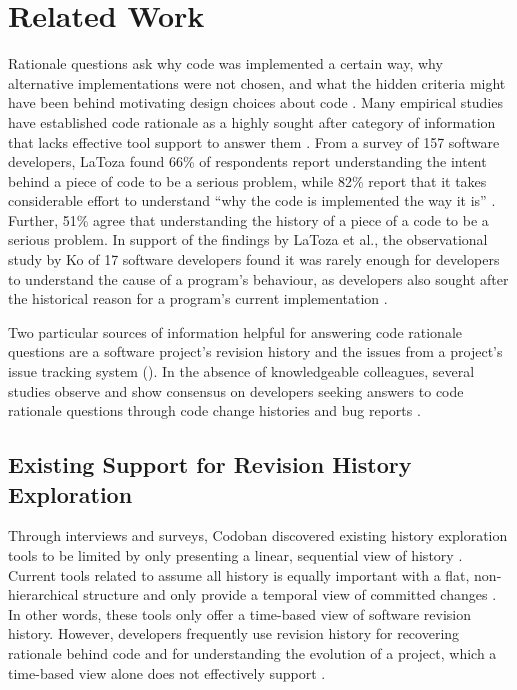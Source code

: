 \chapter{Related Work}
\label{ch:Related-Work}

Rationale questions ask why code was implemented a certain way, 
why alternative implementations were not chosen, and what the hidden criteria might have been behind motivating design choices about code \cite{latoza_hard-answer_2010}.
Many empirical studies have established code rationale as a highly sought after category of information that lacks effective tool support to answer them \cite{latoza_maintaining_2006, latoza_hard-answer_2010, ko_information_2007}. 
From a survey of 157 software developers, LaToza \etal found 66\% of respondents report understanding the intent behind a piece of code to be a serious problem, 
while 82\% report that it takes considerable effort to understand ``why the code is implemented the way it is'' \cite{latoza_maintaining_2006}.
Further, 51\% agree that understanding the history of a piece of a code to be a serious problem.
In support of the findings by LaToza et al., the observational study by Ko \etal of 17 software developers found it was rarely enough for developers to understand the cause of a program's behaviour, 
as developers also sought after the historical reason for a program's current implementation \cite{ko_information_2007}.

Two particular sources of information helpful for answering code rationale questions are a software project's revision history and the issues from a project's issue tracking system (). 
In the absence of knowledgeable colleagues, several studies observe and show consensus on developers seeking answers to code rationale questions through code change histories and bug reports \cite{ko_information_2007, codoban_software_2015, robillard_turnover-induced_2021}.

\section{Existing Support for Revision History Exploration}

Through interviews and surveys, Codoban \etal discovered existing history exploration tools to be limited by only presenting a linear, sequential view of history \cite{codoban_software_2015}.
Current tools related to  assume all history is equally important with a flat, non-hierarchical structure and only provide a temporal view of committed changes \cite{codoban_software_2015}.
In other words, these tools only offer a time-based view of software revision history.
However, developers frequently use revision history for recovering rationale behind code and for understanding the evolution of a project, 
which a time-based view alone does not effectively support \cite{codoban_software_2015}.

